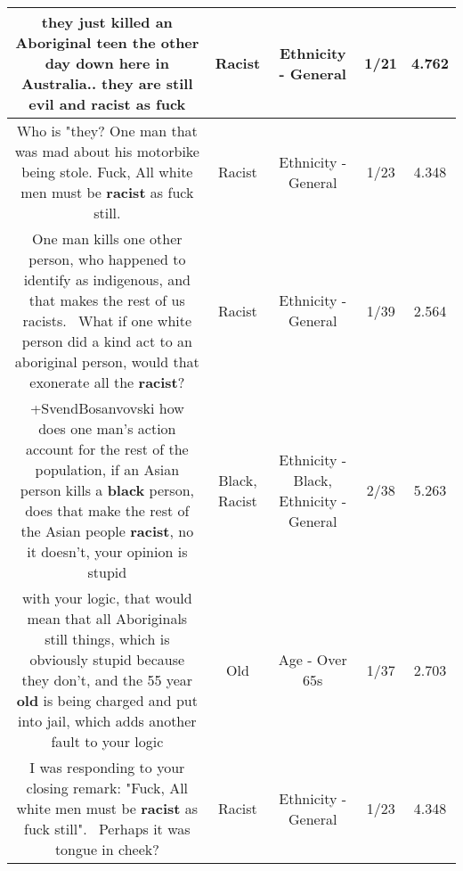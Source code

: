 \documentclass[11pt]{article}
\newlength\mylength
\begin{document}
\begin{center}
\begin{longtable}{|C{.65\mylength}|C{.30\mylength}|C{.12\mylength}|C{.12\mylength}|C{.12\mylength}|}
  \small they just killed an Aboriginal teen the other day down here in Australia.. they are still evil and \textbf{racist} as fuck\normalsize   & Racist & Ethnicity - General & 1/21 & 4.762 \\  \hline
  \small Who is "they? One man that was mad about his motorbike being stole. Fuck, All white men must be \textbf{racist} as fuck still.\normalsize   & Racist & Ethnicity - General & 1/23 & 4.348 \\  \hline
  \small One man kills one other person, who happened to identify as indigenous, and that makes the rest of us racists.  What if one white person did a kind act to an aboriginal person, would that exonerate all the \textbf{racist}?\normalsize   & Racist & Ethnicity - General & 1/39 & 2.564 \\  \hline
  \small +SvendBosanvovski how does one man's action account for the rest of the population, if an Asian person kills a \textbf{black} person, does that make the rest of the Asian people \textbf{racist}, no it doesn't, your opinion is stupid\normalsize   & Black, Racist & Ethnicity - Black, Ethnicity - General & 2/38 & 5.263 \\  \hline
  \small with your logic, that would mean that all Aboriginals still things, which is obviously stupid because they don't, and the 55 year \textbf{old} is being charged and put into jail, which adds another fault to your logic\normalsize   & Old & Age - Over 65s & 1/37 & 2.703 \\  \hline
  \small I was responding to your closing remark: "Fuck, All white men must be \textbf{racist} as fuck still".  Perhaps it was tongue in cheek?\normalsize   & Racist & Ethnicity - General & 1/23 & 4.348 \\  \hline

\end{longtable}
\end{center}
\end{document}
